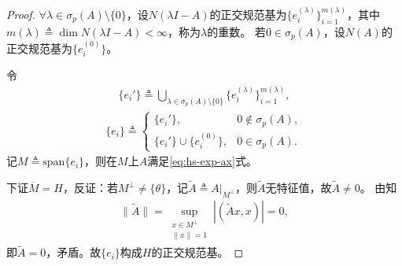 \documentclass[../../main.tex]{subfiles}%
\begin{document}
\begin{proof}
$\forall\lambda\in\sigma_p(A)\setminus\{0\}$，设$N(\lambda I-A)$的正交规范基为$\{e_i^{(\lambda)}\}_{i=1}^{m(\lambda)}$，其中$m(\lambda)\triangleq\dim N(\lambda I-A)<\infty$，称为$\lambda$的重数。
若$0\in\sigma_p(A)$，设$N(A)$的正交规范基为$\{e_i^{(0)}\}$。

令
\begin{align*}
\{e_i'\}\triangleq\bigcup\limits_{\lambda\in\sigma_p(A)\setminus\{0\}}\{e_i^{(\lambda)}\}_{i=1}^{m(\lambda)},
\end{align*}
\begin{align*}
\{e_i\}\triangleq
\begin{cases}
\{e_i'\},&0\notin\sigma_p(A),\\
\{e_i'\}\cup\{e_i^{(0)}\},&0\in\sigma_p(A).
\end{cases}
\end{align*}
记$M\triangleq\mathrm{span}\{e_i\}$，则在$M$上$A$满足\eqref{eq:hs-exp-ax}式。

下证$\overline{M}=H$，反证：若$M^\perp\neq\{\theta\}$，记$\widetilde{A}\triangleq A|_{M^\perp}$，则$\widetilde{A}$无特征值，故$\widetilde{A}\neq0$。
由知
\begin{align*}
\|\widetilde{A}\|=\sup_{\substack{x\in M^\perp\\\|x\|=1}}|(\widetilde{A}x,x)|=0,
\end{align*}
即$\widetilde{A}=0$，矛盾。故$\{e_i\}$构成$H$的正交规范基。
\end{proof}
\end{document}
